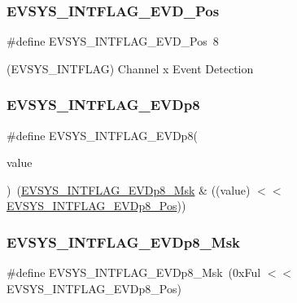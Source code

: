 \subsubsection{\texorpdfstring{EVSYS\_INTFLAG\_EVD\_Pos}{EVSYS\_INTFLAG\_EVD\_Pos}}
{\footnotesize\ttfamily \#define E\+V\+S\+Y\+S\+\_\+\+I\+N\+T\+F\+L\+A\+G\+\_\+\+E\+V\+D\+\_\+\+Pos~8}



(E\+V\+S\+Y\+S\+\_\+\+I\+N\+T\+F\+L\+AG) Channel x Event Detection 

\mbox{\label{group___s_a_m_d21___e_v_s_y_s_gaee6579cb5b0e3cbf226a050cda567629}} 
\subsubsection{\texorpdfstring{EVSYS\_INTFLAG\_EVDp8}{EVSYS\_INTFLAG\_EVDp8}}
{\footnotesize\ttfamily \#define E\+V\+S\+Y\+S\+\_\+\+I\+N\+T\+F\+L\+A\+G\+\_\+\+E\+V\+Dp8(\begin{DoxyParamCaption}\item[{}]{value }\end{DoxyParamCaption})~(\mbox{\hyperlink{group___s_a_m_d21___e_v_s_y_s_gaa62a8820e5ed8fe48ef63894feddcedc}{E\+V\+S\+Y\+S\+\_\+\+I\+N\+T\+F\+L\+A\+G\+\_\+\+E\+V\+Dp8\+\_\+\+Msk}} \& ((value) $<$$<$ \mbox{\hyperlink{group___s_a_m_d21___e_v_s_y_s_ga636ccdba5cad0fa3b4c14a2d0f88681b}{E\+V\+S\+Y\+S\+\_\+\+I\+N\+T\+F\+L\+A\+G\+\_\+\+E\+V\+Dp8\+\_\+\+Pos}}))}

\mbox{\label{group___s_a_m_d21___e_v_s_y_s_gaa62a8820e5ed8fe48ef63894feddcedc}} 
\subsubsection{\texorpdfstring{EVSYS\_INTFLAG\_EVDp8\_Msk}{EVSYS\_INTFLAG\_EVDp8\_Msk}}
{\footnotesize\ttfamily \#define E\+V\+S\+Y\+S\+\_\+\+I\+N\+T\+F\+L\+A\+G\+\_\+\+E\+V\+Dp8\+\_\+\+Msk~(0x\+Ful $<$$<$ E\+V\+S\+Y\+S\+\_\+\+I\+N\+T\+F\+L\+A\+G\+\_\+\+E\+V\+Dp8\+\_\+\+Pos)}

